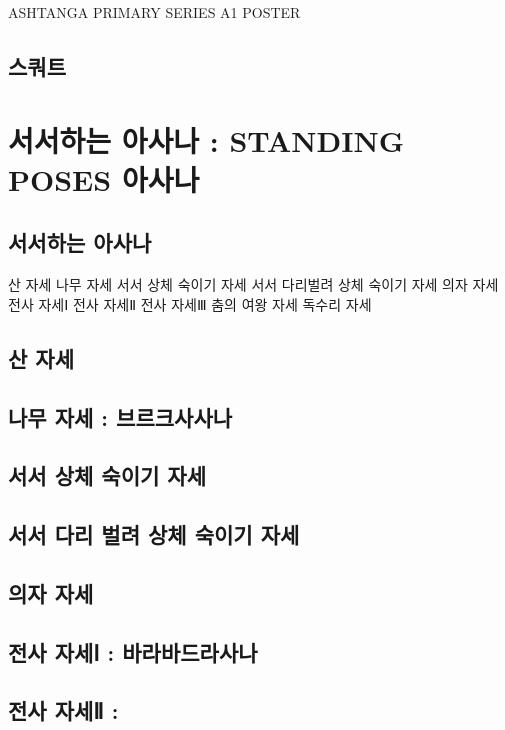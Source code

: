 \documentclass[12pt, a4paper, oneside]{book}
\let\stdsection\section
\renewcommand\section{\newpage\stdsection}
\begin{document}
ASHTANGA PRIMARY SERIES A1 POSTER


		\section{스쿼트}

	\chapter{ 서서하는 아사나 : STANDING POSES 아사나}
	\newpage
	\minitoc




		\section{서서하는 아사나}
산 자세
나무 자세
서서 상체 숙이기 자세
서서 다리벌려 상체 숙이기 자세
의자 자세
전사 자세Ⅰ
전사 자세Ⅱ
전사 자세Ⅲ
춤의 여왕 자세
독수리 자세

		\section{산 자세}
		\section{나무 자세 : 브르크사사나}
		\section{서서 상체 숙이기 자세}
		\section{서서 다리 벌려 상체 숙이기 자세}
		\section{의자 자세}

		\section{전사 자세Ⅰ : 바라바드라사나}
		\section{전사 자세Ⅱ : }
\end{document}
